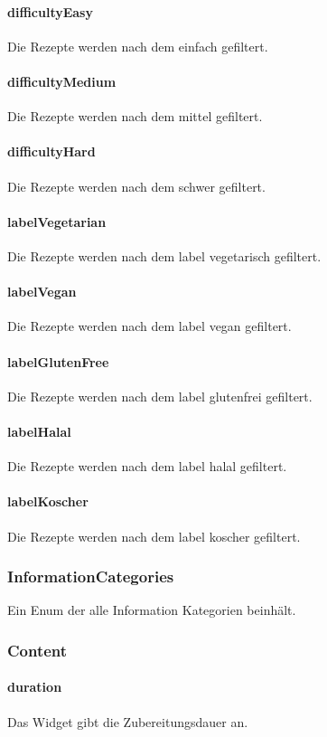 \documentclass{entwurfsheft}
\begin{document}
\paragraph*{difficultyEasy} Die Rezepte werden nach dem  einfach gefiltert.
\paragraph*{difficultyMedium} Die Rezepte werden nach dem  mittel gefiltert.
\paragraph*{difficultyHard} Die Rezepte werden nach dem  schwer gefiltert.
\paragraph*{labelVegetarian} Die Rezepte werden nach dem \gls{label} vegetarisch gefiltert.
\paragraph*{labelVegan} Die Rezepte werden nach dem \gls{label} vegan gefiltert.
\paragraph*{labelGlutenFree} Die Rezepte werden nach dem \gls{label} glutenfrei gefiltert.
\paragraph*{labelHalal} Die Rezepte werden nach dem \gls{label} halal gefiltert.
\paragraph*{labelKoscher} Die Rezepte werden nach dem \gls{label} koscher gefiltert.


\subsubsection{InformationCategories}\label{sec:InformationCategories}
Ein Enum der alle Information Kategorien beinhält.
\subsubsection*{Content}
\paragraph*{duration} Das Widget gibt die Zubereitungsdauer an.
\end{document}
